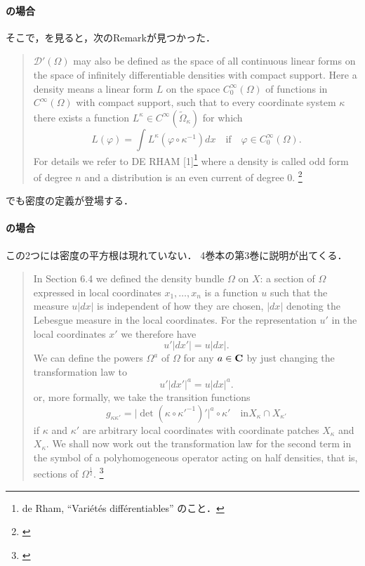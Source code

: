 \paragraph{\cite{Hor63,Hor89}の場合}

そこで，\cite{Hor63}を見ると，次のRemarkが見つかった．
\begin{quotation}
    \(\mathscr{D}'(\varOmega)\) may also be defined 
    as the space of all continuous linear forms 
    on the space of infinitely differentiable densities 
    with compact support. 
    Here a density means a linear form \(L\) 
    on the space \(C_0^\infty(\varOmega)\) of functions 
    in \(C^\infty(\varOmega)\) with compact support, 
    such that to every coordinate system \(\kappa\) 
    there exists a function \(L^\kappa\in C^\infty(\tilde{\varOmega}_\kappa)\) for which
    \[
        L(\varphi)= \int L^\kappa(\varphi\circ\kappa^{-1})dx
        \quad \text{if} \quad \varphi\in C_0^\infty(\varOmega).
    \]
    For details we refer to DE RHAM [1]\footnote{de Rham, ``Vari\'et\'es diff\'erentiables'' のこと．} 
    where a density is called odd form of degree \(n\) 
    and a distribution is an even current of degree 0.
    \footnote{\cite[p.28]{Hor63}}
\end{quotation}
\cite[p.145]{Hor89}でも密度の定義が登場する．

\paragraph{\cite{Hor85}の場合}
この2つには密度の平方根は現れていない．
4巻本の第3巻\cite[18章]{Hor85}に説明が出てくる．
\begin{quotation}
    In Section 6.4 we defined the density bundle \(\varOmega\) 
    on \(X\): a section of \(\varOmega\) expressed 
    in local coordinates \(x_1,\dots,x_n\) is a function \(u\) 
    such that the measure \(u|dx|\) is independent of 
    how they are chosen, \(|dx|\) denoting the Lebesgue measure 
    in the local coordinates. 
    For the representation \(u'\) in the local coordinates \(x'\) 
    we therefore have
    \[u' |dx'|=u|dx|.\]
    We can define the powers \(\varOmega^a\) 
    of \(\varOmega\) for any \(a\in\mathbf{C}\) by just changing the
    transformation law to
    \[u' |dx'|^a=u|dx|^a.\]
    or, more formally, we take the transition functions
    \[
        g_{\kappa\kappa'}=\lvert
            \det(\kappa\circ\kappa'^{-1})'
        \rvert^a\circ\kappa'
        \quad
        \text{in}
        X_{\kappa}\cap X_{\kappa'}
    \]
    if \(\kappa\) and \(\kappa'\) are 
    arbitrary local coordinates 
    with coordinate patches \(X_{\kappa}\) and \(X_{\kappa}\). 
    We shall now work out the transformation law 
    for the second term in the symbol 
    of a polyhomogeneous operator acting on half densities, 
    that is, sections of \(\varOmega^{\frac{1}{2}}\). \footnote{\cite[p.92]{Hor85}}
\end{quotation}

